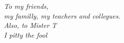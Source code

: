 \cleardoublepage
\thispagestyle{empty}
\begin{center}
\Large\itshape
To my friends,\\
my familly, my teachers and collegues.\\
Also, to Mister T\\
I pitty the fool
\end{center}
